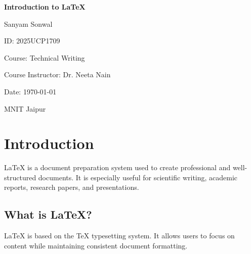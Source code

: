 \documentclass[12pt,a4paper]{report}
\begin{document}
\begin{titlepage}
    \thispagestyle{empty}
    \centering

    \vspace*{2cm}

    {\Huge\bfseries Introduction to LaTeX\par}

    \vspace{2cm}

    {\Large Sanyam Sonwal\par}

    \vspace{0.5cm}

    ID: 2025UCP1709

    \vspace{1cm}

    Course: Technical Writing

    \vspace{0.5cm}

    Course Instructor: Dr. Neeta Nain

    \vspace{1cm}

    Date: \today

    \vfill

    MNIT Jaipur

\end{titlepage}


\begin{abstract}
This document provides an introduction to LaTeX,
a document preparation system widely used for
technical and scientific writing. It explains the
basic structure of LaTeX documents, formatting
commands, chapters, sections, and other important
features used to create professional documents.
\end{abstract}

\chapter{Introduction}

LaTeX is a document preparation system used to
create professional and well-structured documents.
It is especially useful for scientific writing,
academic reports, research papers, and presentations.

\section{What is LaTeX?}

LaTeX is based on the TeX typesetting system.
It allows users to focus on content while maintaining
consistent document formatting.
\end{document}
